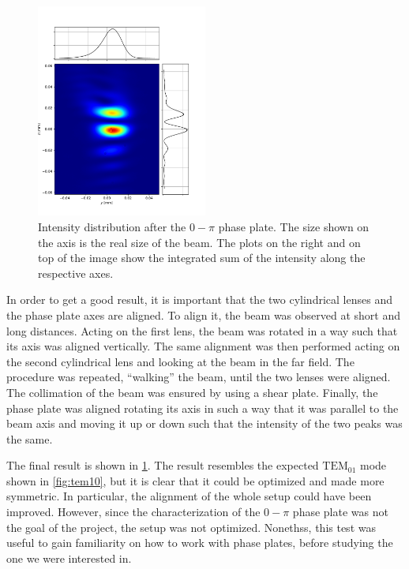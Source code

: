 \begin{figure}
    \centering
    \includegraphics[width=0.5\textwidth]{chapters/chapter_3/figures/0pi_image.pdf}
    \caption{Intensity distribution after the $0-\pi$ phase plate. The size shown on the axis is the real size of the beam. The plots on the right and on top of the image show the integrated sum of the intensity along the respective axes.}
    \label{fig:0pi_image}
\end{figure}


In order to get a good result, it is important that the two cylindrical lenses and the phase plate axes are aligned. To align it, the beam was observed at short and long distances. Acting on the first lens, the beam was rotated in a way such that its axis was aligned vertically. The same alignment was then performed acting on the second cylindrical lens and looking at the beam in the far field. The procedure was repeated, \enquote{walking} the beam, until the two lenses were aligned. The collimation of the beam was ensured by using a shear plate. Finally, the phase plate was aligned rotating its axis in such a way that it was parallel to the beam axis and moving it up or down such that the intensity of the two peaks was the same.

The final result is shown in \cref{fig:0pi_image}. The result resembles the expected $\text{TEM}_{01}$ mode shown in \cref{fig:tem10}, but it is clear that it could be optimized and made more symmetric. In particular, the alignment of the whole setup could have been improved.  However, since the characterization of the $0-\pi$ phase plate was not the goal of the project, the setup was not optimized. Nonethss, this test was useful to gain familiarity on how to work with phase plates, before studying the one we were interested in.



